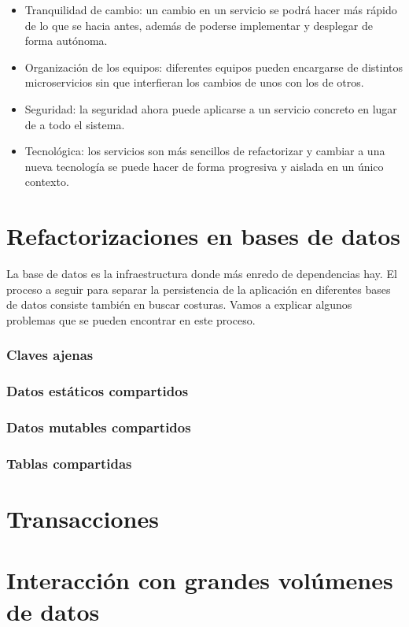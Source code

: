\documentclass[11pt,a4paper]{article}
\begin{document}
\begin{itemize}

\item Tranquilidad de cambio: un cambio en un servicio se podrá hacer más rápido de lo que se hacia antes, además de poderse implementar y desplegar de forma autónoma.

\item Organización de los equipos: diferentes equipos pueden encargarse de distintos microservicios sin que interfieran los cambios de unos con los de otros.

\item Seguridad: la seguridad ahora puede aplicarse a un servicio concreto en lugar de a todo el sistema.

\item Tecnológica: los servicios son más sencillos de refactorizar y cambiar a una nueva tecnología se puede hacer de forma progresiva y aislada en un único contexto.

\end{itemize}


\part{Refactorizaciones en bases de datos}

La base de datos es la infraestructura donde más enredo de dependencias hay. El proceso a seguir para separar la persistencia de la aplicación en diferentes bases de datos consiste también en buscar costuras. Vamos a explicar algunos problemas que se pueden encontrar en este proceso.

\section{Claves ajenas}

\section{Datos estáticos compartidos}

\section{Datos mutables compartidos}

\section{Tablas compartidas}


\part{Transacciones}

\part{Interacción con grandes volúmenes de datos}
\end{document}
